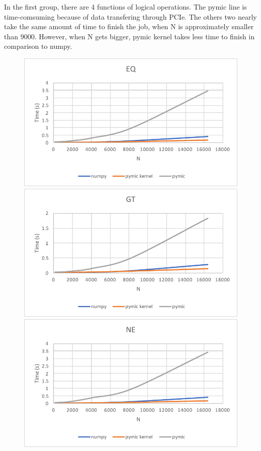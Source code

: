 In the first group, there are 4 functions of logical operations. The pymic line is time-comsuming because of data transfering through PCIe. The others two nearly take the same amount of time to finish the job, when N is approximately smaller than 9000. However, when N gets bigger, pymic kernel takes less time to finish in comparison to numpy.
\begin{figure}[]
\includegraphics[scale=0.5]{img/group1/eq.pdf}
\includegraphics[scale=0.5]{img/group1/gt.pdf}
\includegraphics[scale=0.5]{img/group1/ne.pdf}

\end{figure}
